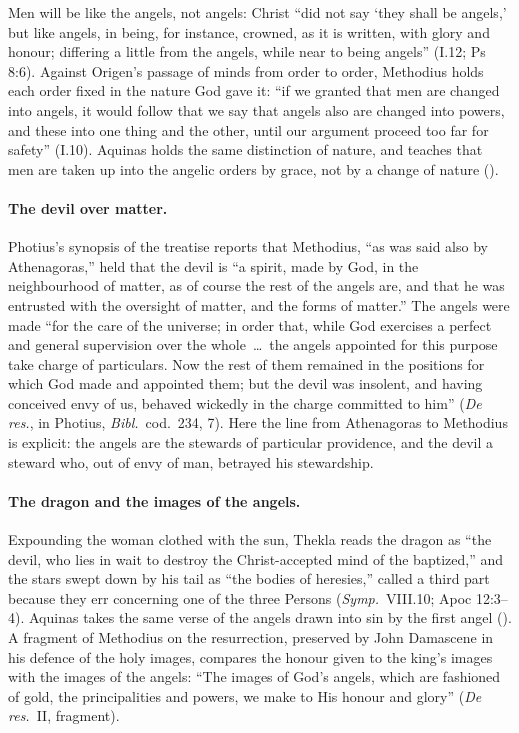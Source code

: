 \noindent Men will be like the angels, not angels: Christ ``did not say `they
shall be angels,' but like angels, in being, for instance, crowned, as it
is written, with glory and honour; differing a little from the angels,
while near to being angels'' (I.12; Ps 8:6). Against Origen's passage of
minds from order to order, Methodius holds each order fixed in the nature
God gave it: ``if we granted that men are changed into angels, it would
follow that we say that angels also are changed into powers, and these
into one thing and the other, until our argument proceed too far for
safety'' (I.10). Aquinas holds the same distinction of nature, and
teaches that men are taken up into the angelic orders by grace, not by a
change of nature ().

\paragraph{The devil over matter.} Photius's synopsis of the treatise
reports that Methodius, ``as was said also by Athenagoras,'' held that the
devil is ``a spirit, made by God, in the neighbourhood of matter, as of
course the rest of the angels are, and that he was entrusted with the
oversight of matter, and the forms of matter.'' The angels were made ``for
the care of the universe; in order that, while God exercises a perfect and
general supervision over the whole~\dots\ the angels appointed for this
purpose take charge of particulars. Now the rest of them remained in the
positions for which God made and appointed them; but the devil was
insolent, and having conceived envy of us, behaved wickedly in the charge
committed to him'' (\emph{De res.}, in Photius, \emph{Bibl.}\ cod.~234, 7). Here the line
from Athenagoras to Methodius is explicit: the angels are the stewards of
particular providence, and the devil a steward who, out of envy of man,
betrayed his stewardship.

\paragraph{The dragon and the images of the angels.} Expounding the woman
clothed with the sun, Thekla reads the dragon as ``the devil, who lies in
wait to destroy the Christ-accepted mind of the baptized,'' and the stars
swept down by his tail as ``the bodies of heresies,'' called a third part
because they err concerning one of the three Persons (\emph{Symp.}\
VIII.10; Apoc 12:3--4). Aquinas takes the same verse of the angels drawn
into sin by the first angel (\ST{I q.~63 a.~8 s.c.}). A fragment of
Methodius on the resurrection, preserved by John Damascene in his defence
of the holy images, compares the honour given to the king's images with
the images of the angels: ``The images of God's angels, which are
fashioned of gold, the principalities and powers, we make to His honour
and glory'' (\emph{De res.}\ II, fragment).

